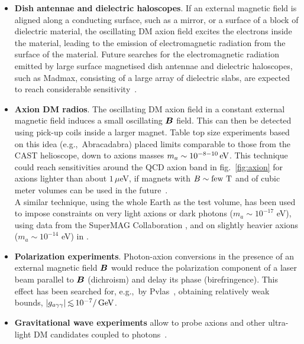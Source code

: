 \begin{itemize}

\item[$-$]
{\bf Dish antennae and dielectric haloscopes}. 
If an external magnetic field is aligned along a conducting surface, such as a mirror, or a surface of a block of dielectric material, the oscillating DM axion field excites the electrons inside the material, 
leading to the emission of electromagnetic radiation from the  surface of the material.  
Future searches for the electromagnetic radiation emitted by large surface magnetised dish antennae and dielectric haloscopes, such as {\sc Madmax}, consisting of a large array of dielectric slabs, are expected to reach considerable sensitivity~\cite{MADMAX}.  


\item[$-$]
{\bf Axion DM radios}. The oscillating DM axion field in a constant external magnetic field induces a small oscillating $\bm{B}$ field. 
This can then be detected using pick-up coils inside a larger magnet. 
Table top size experiments based on this idea (e.g.,~{\sc Abracadabra}) placed limits 
comparable to those from the CAST helioscope, down to axions masses $m_a\sim 10^{-8-10} \,{\rm eV}$.
This technique could reach sensitivities around the QCD axion band in fig.~\ref{fig:axion} for axions lighter than about $1\,\mu$eV,
if magnets with $B \sim \hbox{few T}$ and of cubic meter volumes can be used in the future~\cite{axion:DM:radios,ABRACADABRA,SHAFT,BASE,DMRadio}. \\
A similar technique, using the whole Earth as the test volume, has been used to impose constraints on very light axions or dark photons ($m_a \sim 10^{-17}$ eV), using data from the {\sc SuperMAG} Collaboration \cite{SuperMAG}, and on slightly heavier axions ($m_a \sim 10^{-14}$ eV) in \cite{Taruya:2025zql}.

\item[$-$]
{\bf Polarization experiments}. Photon-axion conversions in the presence of an external magnetic field $\bm{B}$ would reduce the 
polarization component of a laser beam parallel to $\bm{B}$ (dichroism) and delay its phase (birefringence).
This effect has been searched for, e.g.,~by {\sc Pvlas}~\cite{PVLAS}, obtaining relatively weak bounds, $|g_{a\gamma\gamma}|\circa{<}10^{-7}/\GeV$.

\item[$-$] {\bf Gravitational wave experiments} allow to probe axions and other ultra-light DM candidates coupled to photons~\cite{GWexpDM}.
\end{itemize}




